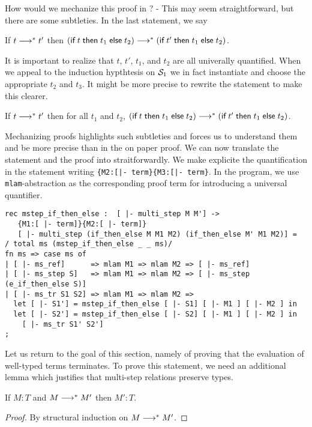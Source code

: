 How would we mechanize this proof in \beluga? - This may seem
straightforward, but there are some subtleties. In the last statement,
we say 

\begin{center}
If $t \MSteps t'$ then $(\tmif t {t_1} {t_2}) \MSteps (\tmif {t'} {t_1} {t_2})$.  
\end{center}

It is important to realize that $t$, $t'$, $t_1$, and $t_2$ are all
univerally quantified.  When we appeal to the induction hypthtesis on
$\S_1$ we in fact instantiate and choose the appropriate $t_2$ and
$t_3$. It might be more precise to rewrite the statement to make this clearer.

\begin{center}
If $t \MSteps t'$ then for all $t_1$ and $t_2$, $(\tmif t {t_1} {t_2}) \MSteps (\tmif {t'} {t_1} {t_2})$.  
\end{center}

Mechanizing proofs highlights such subtleties and forces us to
understand them and be more precise than in the on paper proof. We can
now translate the statement and the proof into 
\beluga straitforwardly. We make explicite the quantification in the
statement writing \lstinline!{M2:[|- term}{M3:[|- term}!. In the
program, we use \lstinline!mlam!-abstraction as the corresponding
proof term for introducing a universal quantifier.

\begin{lstlisting}
rec mstep_if_then_else :  [ |- multi_step M M'] ->
   {M1:[ |- term]}{M2:[ |- term]}
   [ |- multi_step (if_then_else M M1 M2) (if_then_else M' M1 M2)] =
/ total ms (mstep_if_then_else _ _ ms)/
fn ms => case ms of
| [ |- ms_ref]      => mlam M1 => mlam M2 => [ |- ms_ref]
| [ |- ms_step S]   => mlam M1 => mlam M2 => [ |- ms_step (e_if_then_else S)]
| [ |- ms_tr S1 S2] => mlam M1 => mlam M2 => 
  let [ |- S1'] = mstep_if_then_else [ |- S1] [ |- M1 ] [ |- M2 ] in
  let [ |- S2'] = mstep_if_then_else [ |- S2] [ |- M1 ] [ |- M2 ] in
    [ |- ms_tr S1' S2']
;
\end{lstlisting}


Let us return to the goal of this section, namely of proving that the
evaluation of well-typed terms terminates. To prove this statement, we
need an additional lemma which justifies that multi-step relations
preserve types.

\begin{lemma}
If $M : T$ and $M \MSteps M'$ then $M':T$.
\end{lemma}
\begin{proof}
By structural induction on $M \MSteps M'$.
\end{proof}

